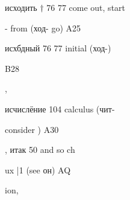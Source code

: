 \begin{minipage}[t]{0.475\textwidth}
\noindent исходить $\dagger$ 76 77 come out, start\par
\noindent - from (ход- go) A25\par
\noindent исхбдный 76 77 initial (ход-)\par
\noindent B28\par
\noindent ,\par
\noindent исчислёние 104 calculus (чит-\par
\noindent consider ) A30\par
\noindent , итак 50 and so ch\par
\noindent ux |1 (see он) AQ\par
\noindent ion,\par
\end{minipage}
\endgroup

\clearpage
\thispagestyle{plain}
\begingroup
\cyrillicfont
\fontsize{7.25}{8.25}\selectfont
\setlength{\parindent}{0pt}
\setlength{\parskip}{0pt}
\setlength{\emergencystretch}{1.5em}
\noindent
